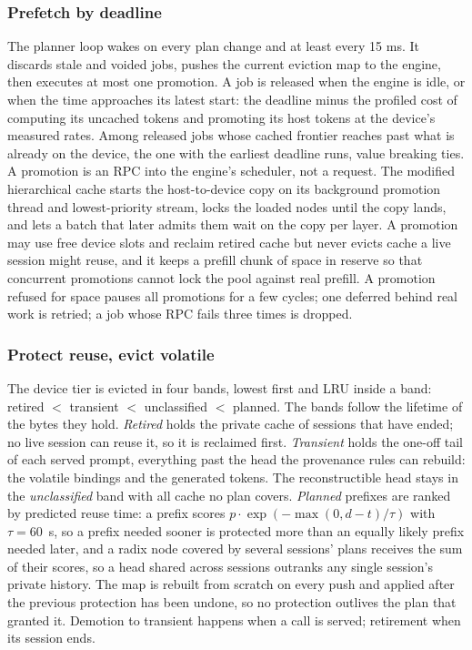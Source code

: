 \subsubsection{Prefetch by deadline}
\label{sec:deadline}

The planner loop wakes on every plan change and at least every 15 ms. It discards stale and voided jobs, pushes the current eviction map to the engine, then executes at most one promotion. A job is released when the engine is idle, or when the time approaches its latest start: the deadline minus the profiled cost of computing its uncached tokens and promoting its host tokens at the device's measured rates. Among released jobs whose cached frontier reaches past what is already on the device, the one with the earliest deadline runs, value breaking ties. A promotion is an RPC into the engine's scheduler, not a request. The modified hierarchical cache starts the host-to-device copy on its background promotion thread and lowest-priority stream, locks the loaded nodes until the copy lands, and lets a batch that later admits them wait on the copy per layer. A promotion may use free device slots and reclaim retired cache but never evicts cache a live session might reuse, and it keeps a prefill chunk of space in reserve so that concurrent promotions cannot lock the pool against real prefill. A promotion refused for space pauses all promotions for a few cycles; one deferred behind real work is retried; a job whose RPC fails three times is dropped.

\subsubsection{Protect reuse, evict volatile}
\label{sec:eviction}

The device tier is evicted in four bands, lowest first and LRU inside a band: retired $<$ transient $<$ unclassified $<$ planned. The bands follow the lifetime of the bytes they hold. \emph{Retired} holds the private cache of sessions that have ended; no live session can reuse it, so it is reclaimed first. \emph{Transient} holds the one-off tail of each served prompt, everything past the head the provenance rules can rebuild: the volatile bindings and the generated tokens. The reconstructible head stays in the \emph{unclassified} band with all cache no plan covers. \emph{Planned} prefixes are ranked by predicted reuse time: a prefix scores $p \cdot \exp(-\max(0, d - t)/\tau)$ with $\tau = 60$~s, so a prefix needed sooner is protected more than an equally likely prefix needed later, and a radix node covered by several sessions' plans receives the sum of their scores, so a head shared across sessions outranks any single session's private history. The map is rebuilt from scratch on every push and applied after the previous protection has been undone, so no protection outlives the plan that granted it. Demotion to transient happens when a call is served; retirement when its session ends.

